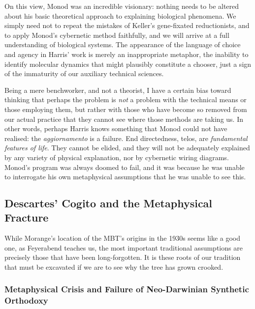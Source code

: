 On this view, Monod was an incredible visionary: nothing needs to be altered about his basic theoretical approach to explaining biological phenomena. We simply need not to repeat the mistakes of Keller's gene-fixated reductionists, and to apply Monod's cybernetic method faithfully, and we will arrive at a full understanding of biological systems. The appearance of the language of choice and agency in Harris' work is merely an inappropriate metaphor, the inability to identify molecular dynamics that might plausibly constitute a chooser, just a sign of the immaturity of our auxiliary technical sciences.

Being a mere benchworker, and not a theorist, I have a certain bias toward thinking that perhaps the problem is \textit{not} a problem with the technical means or those employing them, but rather with those who have become so removed from our actual practice that they cannot see where those methods are taking us. In other words, perhaps Harris knows something that Monod could not have realised: the \textit{aggiornamento} is a failure. End directedness, telos, are \textit{fundamental features of life}. They cannot be elided, and they will not be adequately explained by any variety of physical explanation, nor by cybernetic wiring diagrams. Monod's program was always doomed to fail, and it was because he was unable to interrogate his own metaphysical assumptions that he was unable to see this.

\subsection{Descartes' Cogito and the Metaphysical Fracture}



While Morange's location of the MBT's origins in the 1930s seems like a good one, as Feyerabend teaches us, the most important traditional assumptions are precisely those that have been long-forgotten. It is these roots of our tradition that must be excavated if we are to see why the tree has grown crooked.








\subsubsection{Metaphysical Crisis and Failure of Neo-Darwinian Synthetic Orthodoxy}

